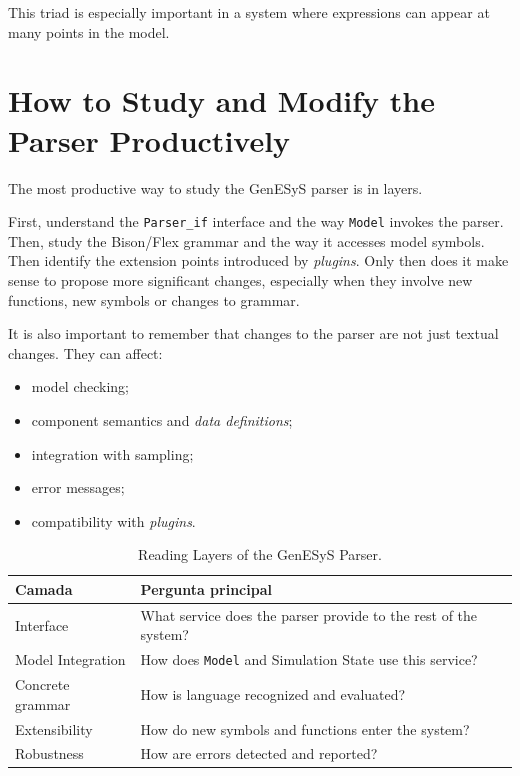 This triad is especially important in a system where expressions can appear at many points in the model.

\section{How to Study and Modify the Parser Productively}
\label{sec:cap9_como_estudar_modificar_parser}

The most productive way to study the GenESyS parser is in layers.

First, understand the \texttt{Parser\_if} interface and the way \texttt{Model} invokes the parser. Then, study the Bison/Flex grammar and the way it accesses model symbols. Then identify the extension points introduced by \textit{plugins}. Only then does it make sense to propose more significant changes, especially when they involve new functions, new symbols or changes to grammar.

It is also important to remember that changes to the parser are not just textual changes. They can affect:
\begin{itemize}
 \item model checking;
 \item component semantics and \textit{data definitions};
 \item integration with sampling;
 \item error messages;
 \item compatibility with \textit{plugins}.
\end{itemize}

\begin{table}[htbp]
 \centering
 \caption{Reading Layers of the GenESyS Parser.}
 \label{tab:cap9_camadas_leitura_parser}
 \small
 \begin{tabular}{|p{3.9cm}|p{7.3cm}|}
 \hline
 \textbf{Camada} & \textbf{Pergunta principal} \\
 \hline
 Interface & What service does the parser provide to the rest of the system? \\
 \hline
 Model Integration & How does \texttt{Model} and Simulation State use this service? \\
 \hline
 Concrete grammar & How is language recognized and evaluated? \\
 \hline
 Extensibility & How do new symbols and functions enter the system? \\
 \hline
 Robustness & How are errors detected and reported? \\
 \hline
 \end{tabular}
\end{table}

